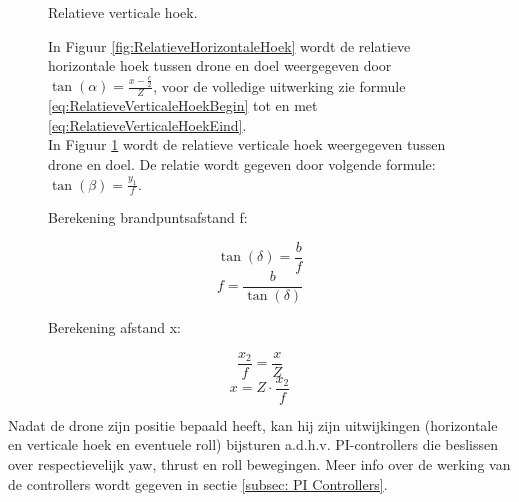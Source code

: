 \begin{figure}[H]
\begin{minipage}{.45\textwidth}
		\caption{Relatieve verticale hoek.}
		\label{fig:RelatieveVerticaleHoek}
	\end{minipage}%
	\caption*{In Figuur \ref{fig:RelatieveHorizontaleHoek} wordt de relatieve horizontale hoek tussen drone en doel weergegeven door \(\tan(\alpha) = \frac{x-\frac{c}{2}}{Z}\), voor de volledige uitwerking zie formule \ref{eq:RelatieveVerticaleHoekBegin} tot en met \ref{eq:RelatieveVerticaleHoekEind}.\\
		In Figuur \ref{fig:RelatieveVerticaleHoek} wordt de relatieve verticale hoek weergegeven tussen drone en doel. De relatie wordt gegeven door volgende formule: \(\tan(\beta) = \frac{y_1}{f}\).}
\end{figure}
\begin{figure}[H]
	\centering
	\begin{minipage}{.45\textwidth}
	\begin{center}
			Berekening brandpuntsafstand f:
	\end{center}
		\begin{equation} \label{eq:RelatieveVerticaleHoekBegin}
		\tan(\delta) = \frac{b}{f}
		\end{equation}
		\begin{equation} 
		f = \frac{b}{\tan(\delta)}
		\end{equation}
	\end{minipage}
	\begin{minipage}{.45\textwidth}
		\begin{center}
			Berekening afstand x:
		\end{center}
		\begin{equation} 
		\frac{x_2}{f} = \frac{x}{Z}
		\end{equation}
		\begin{equation} \label{eq:RelatieveVerticaleHoekEind}
		x = Z \cdot \frac{x_2}{f}	
		\end{equation}
	\end{minipage}%
\end{figure}
\noindent Nadat de drone zijn positie bepaald heeft, kan hij zijn uitwijkingen (horizontale en verticale hoek en eventuele roll) bijsturen a.d.h.v. PI-controllers die beslissen over respectievelijk yaw, thrust en roll bewegingen. Meer info over de werking van de controllers wordt gegeven in sectie \ref{subsec: PI Controllers}. 
\\
\\
